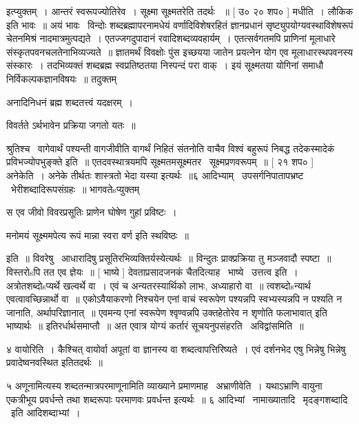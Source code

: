 \documentclass[11pt, openany]{book}
\begin{document}
 इत्प्युक्तम्~। आन्तरं स्वरूपज्योतिरेव~। सूक्ष्मा सूक्ष्मतरेति तदर्थः
~॥ [ उ० २० शप० ] मधीति~। लौकिक इति भावः~॥ अयं भावः \textendash\ विन्दोः
शब्दब्रह्मापरनामधेयं वर्णादिविशेषरहितं ज्ञानप्रधानं
सृष्ट्युपयोग्यवस्थाविशेषरूपं चेतनमिश्रं नादमात्रमुत्पद्यते~। 
एतज्जगदुपादानं रवादिशब्दव्यवहार्यम्~। एतत्सर्वगतमपि प्राणिनां मूलाधारे
संस्कृतपवनचलतेनाभिव्यज्यते~॥ ज्ञातमर्थं विवक्षोः पुंस इच्छयया जातेन
प्रयत्नेन योग एव मूलाधारस्थपवनस्य संस्कारः~। तदभिव्यक्तं शब्दब्रह्म
स्वप्रतिष्ठतया निस्पन्दं परा वाक्~। इयं सूक्ष्मतया योगिनां समाधौ
निर्विकल्पकज्ञानविषयः~॥ तदुक्तम् \textendash\ 

 अनादिनिधनं ब्रह्म शब्दतत्त्वं यदक्षरम्~। 

 विवर्तते ऽर्थभावेन प्रक्रिया जगतो यतः~॥

श्रुतिश्च \textendash\ {\qt वागेवार्थं पश्यन्ती} वागजीवीति वागर्थं निहितं संतनोति वाचैव
विश्वं बहुरूपं निबद्ध तदेकस्मादेकं प्रविभज्योपभुङ्क्ते इति~॥
एतदवस्थात्रयमपि सूक्ष्मतमसूक्ष्मतर \textendash\ सूक्ष्मप्रणवरूपम्~॥ [ २१ शप० ]
अनेकेति~। अनेके तीर्थतः शास्त्रतो भेदा यस्या इत्यर्थः~॥६
आदिभ्याम् \textendash\ उपसर्गनिपातापभ्रष्ट \textendash\ भेरीशब्दादिरूपसंग्रहः~॥
भागवतेsप्युक्तम् \textendash\ 

 स एव जीवो विवरप्रसूतिः प्राणेन घोषेण गुहां प्रविष्टः~। 

 मनोमयं सूक्ष्ममपेत्य रूपं मान्ना स्वरा वर्ण इति स्थविष्ठः~॥

इति~॥ विवरेषु \textendash\ आधारादिषु प्रसूतिरभिव्यक्तिर्यस्येत्यर्थः~॥ विन्दुतः
प्राक्प्रक्रिया तु मञ्जवादौ स्पष्टा~॥ विस्तरोsपि तत एव ज्ञेयः~॥ [
भाष्ये ] देवताप्रसादजनकं चैतदित्याह \textendash\ भाष्ये \textendash\ उत्तत्व इति~। 
अत्रोतशब्दोsप्यर्थे खल्वर्थे वा~। एवं च अन्यतरस्यार्थिको लाभः, अध्याहारो
वा~॥ त्वशब्दोsन्यार्थ एवत्वावच्छिन्नार्थो वा~॥ एकोऽवैयाकरणो निश्चयेन
एनां वाचं स्वरूपेण पश्यन्नपि स्वभ्यस्यन्नपि न पश्यति न जानाति,
अर्थापरिज्ञानात्~॥ एवमन्य एनां स्वरूपेण श्वृण्वन्नपि उक्तहेतोरेव न
शृणोति फलाभावात् इति भाष्यार्थः~॥ इतिरर्धार्थसमाप्तौ~॥ अत एवात्र
योग्यं कर्तारं सूचयनुपसंहरति \textendash\ अविद्वांसमिति~॥ 



४ वायोरिति~। कैश्चित् वायोर्वा अपूतां वा ज्ञानस्य वा
शब्दत्वापत्तिरिष्यते~। एवं दर्शनभेद एषु भिन्नेषु भिन्नेषु
प्रवादेष्वनवस्थित इतितदर्थः~॥

 ५ अणूनामित्यस्य शब्दतन्मात्रपरमाणूनामिति व्याख्याने प्रमाणमाह \textendash\ 
अभ्राणीवेति~। यथाऽभ्राणि वायुना एकत्रीभूय प्रवर्धन्ते तथा शब्दरूपाः
परमाणवः प्रवर्धन्त इत्यर्थः~॥ ६ आदिभ्यां \textendash\ 
नामाख्यातादि \textendash\ मृदङ्गशब्दादि \textendash\ इति आदिशब्दाभ्यां~। 
\end{document}
